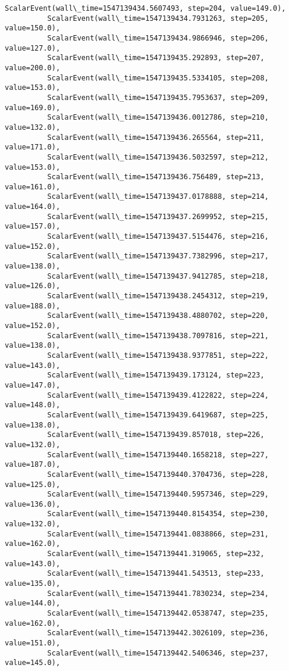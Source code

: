 \documentclass[11pt]{article}
\begin{document}
\begin{Verbatim}[commandchars=\\\{\}]
          ScalarEvent(wall\_time=1547139434.5607493, step=204, value=149.0),
          ScalarEvent(wall\_time=1547139434.7931263, step=205, value=150.0),
          ScalarEvent(wall\_time=1547139434.9866946, step=206, value=127.0),
          ScalarEvent(wall\_time=1547139435.292893, step=207, value=200.0),
          ScalarEvent(wall\_time=1547139435.5334105, step=208, value=153.0),
          ScalarEvent(wall\_time=1547139435.7953637, step=209, value=169.0),
          ScalarEvent(wall\_time=1547139436.0012786, step=210, value=132.0),
          ScalarEvent(wall\_time=1547139436.265564, step=211, value=171.0),
          ScalarEvent(wall\_time=1547139436.5032597, step=212, value=153.0),
          ScalarEvent(wall\_time=1547139436.756489, step=213, value=161.0),
          ScalarEvent(wall\_time=1547139437.0178888, step=214, value=164.0),
          ScalarEvent(wall\_time=1547139437.2699952, step=215, value=157.0),
          ScalarEvent(wall\_time=1547139437.5154476, step=216, value=152.0),
          ScalarEvent(wall\_time=1547139437.7382996, step=217, value=138.0),
          ScalarEvent(wall\_time=1547139437.9412785, step=218, value=126.0),
          ScalarEvent(wall\_time=1547139438.2454312, step=219, value=188.0),
          ScalarEvent(wall\_time=1547139438.4880702, step=220, value=152.0),
          ScalarEvent(wall\_time=1547139438.7097816, step=221, value=138.0),
          ScalarEvent(wall\_time=1547139438.9377851, step=222, value=143.0),
          ScalarEvent(wall\_time=1547139439.173124, step=223, value=147.0),
          ScalarEvent(wall\_time=1547139439.4122822, step=224, value=148.0),
          ScalarEvent(wall\_time=1547139439.6419687, step=225, value=138.0),
          ScalarEvent(wall\_time=1547139439.857018, step=226, value=132.0),
          ScalarEvent(wall\_time=1547139440.1658218, step=227, value=187.0),
          ScalarEvent(wall\_time=1547139440.3704736, step=228, value=125.0),
          ScalarEvent(wall\_time=1547139440.5957346, step=229, value=136.0),
          ScalarEvent(wall\_time=1547139440.8154354, step=230, value=132.0),
          ScalarEvent(wall\_time=1547139441.0838866, step=231, value=162.0),
          ScalarEvent(wall\_time=1547139441.319065, step=232, value=143.0),
          ScalarEvent(wall\_time=1547139441.543513, step=233, value=135.0),
          ScalarEvent(wall\_time=1547139441.7830234, step=234, value=144.0),
          ScalarEvent(wall\_time=1547139442.0538747, step=235, value=162.0),
          ScalarEvent(wall\_time=1547139442.3026109, step=236, value=151.0),
          ScalarEvent(wall\_time=1547139442.5406346, step=237, value=145.0),

\end{Verbatim}
\end{document}
